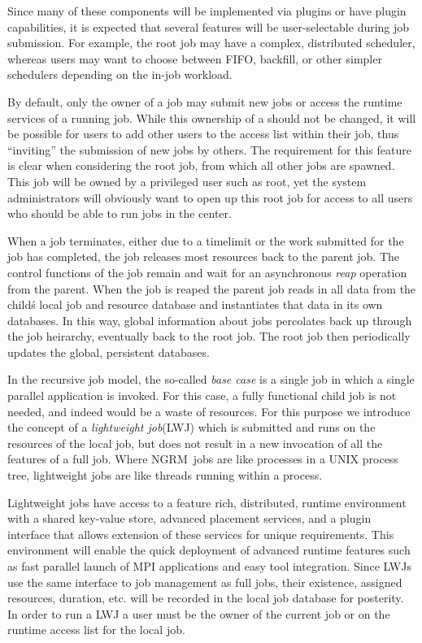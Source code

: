 \documentclass{article}
\newcommand{\ngrm}{NGRM}
\begin{document}
Since many of these components will be implemented via plugins or
have plugin capabilities, it is expected that several features will
be user-selectable during job submission. For example, the root
job may have a complex, distributed scheduler, whereas users may
want to choose between FIFO, backfill, or other simpler schedulers
depending on the in-job workload.

By default, only the owner of a job may submit new jobs or access
the runtime services of a running job.  While this ownership of a
should not be changed, it will be possible for users to add other
users to the access list within their job, thus ``inviting'' the
submission of new jobs by others. The requirement for this feature
is clear when considering the root job, from which all other jobs
are spawned. This job will be owned by a privileged user such as
root, yet the system administrators will obviously want to open
up this root job for access to all users who should be able to
run jobs in the center.

When a job terminates, either due to a timelimit or the work
submitted for the job has completed, the job releases most resources
back to the parent job. The control functions of the job remain and
wait for an asynchronous {\em reap} operation from the parent. When
the job is reaped the parent job reads in all data from the child\'s
local job and resource database and instantiates that data in
its own databases. In this way, global information about jobs
percolates back up through the job heirarchy, eventually back to
the root job.  The root job then periodically updates the global,
persistent databases.

In the recursive job model, the so-called {\em base case} is a
single job in which a single parallel application is invoked. For
this case, a fully functional child job is not needed, and indeed
would be a waste of resources. For this purpose we introduce the
concept of a {\em lightweight job}(LWJ) which is submitted and
runs on the resources of the local job, but does not result in
a new invocation of all the features of a full job. Where \ngrm\
jobs are like processes in a UNIX process tree, lightweight jobs
are like threads running within a process.

Lightweight jobs have access to a feature rich, distributed,
runtime environment with a shared key-value store, advanced
placement services, and a plugin interface that allows extension
of these services for unique requirements. This environment will
enable the quick deployment of advanced runtime features such as
fast parallel launch of MPI applications and easy tool integration.
Since LWJs use the same interface to job management as full
jobs, their existence, assigned resources, duration, etc.
will be recorded in the local job database for posterity.
In order to run a LWJ a user must be the owner of the current
job or on the runtime access list for the local job.
\end{document}
